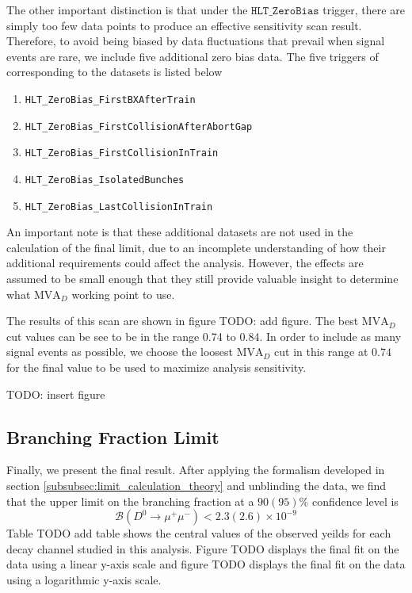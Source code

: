 The other important distinction is that under the $\texttt{HLT\_ZeroBias}$ trigger, there are simply too few data points to produce an effective sensitivity scan result. Therefore, to avoid being biased by data fluctuations that prevail when signal events are rare, we include five additional zero bias data. The five triggers of corresponding to the datasets is listed below
\begin{enumerate}
    \item \texttt{HLT\_ZeroBias\_FirstBXAfterTrain}
    \item \texttt{HLT\_ZeroBias\_FirstCollisionAfterAbortGap}
    \item \texttt{HLT\_ZeroBias\_FirstCollisionInTrain}
    \item \texttt{HLT\_ZeroBias\_IsolatedBunches}
    \item \texttt{HLT\_ZeroBias\_LastCollisionInTrain}
\end{enumerate}
An important note is that these additional datasets are not used in the calculation of the final limit, due to an incomplete understanding of how their additional requirements could affect the analysis. However, the effects are assumed to be small enough that they still provide valuable insight to determine what $\text{MVA}_D$ working point to use. 

The results of this scan are shown in figure TODO: add figure. The best $\text{MVA}_D$ cut values can be see to be in the range 0.74 to 0.84. In order to include as many signal events as possible, we choose the loosest $\text{MVA}_D$ cut in this range at $0.74$ for the final value to be used to maximize analysis sensitivity. 

TODO: insert figure

\subsection{Branching Fraction Limit}
\label{subsec:final_result}

Finally, we present the final result. After applying the formalism developed in section \ref{subsubsec:limit_calculation_theory} and unblinding the data, we find that the upper limit on the branching fraction at a $90(95)\%$ confidence level is
\begin{equation}
    \mathcal{B}(D^0 \to \mu^+ \mu^-) < 2.3(2.6) \times 10^{-9} 
\end{equation}
Table TODO add table shows the central values of the observed yeilds for each decay channel studied in this analysis. Figure TODO displays the final fit on the data using a linear y-axis scale and figure TODO displays the final fit on the data using a logarithmic y-axis scale.